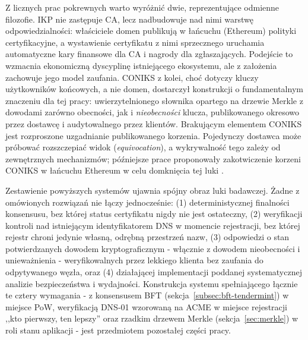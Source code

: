 Z licznych prac pokrewnych warto wyróżnić dwie, reprezentujące odmienne filozofie. IKP \cite{matsumoto2017ikp} nie zastępuje CA, lecz nadbudowuje nad nimi warstwę odpowiedzialności: właściciele domen publikują w łańcuchu (Ethereum) polityki certyfikacyjne, a wystawienie certyfikatu z nimi sprzecznego uruchamia automatyczne kary finansowe dla CA i nagrody dla zgłaszających. Podejście to wzmacnia ekonomiczną dyscyplinę istniejącego ekosystemu, ale z założenia zachowuje jego model zaufania. CONIKS \cite{melara2015coniks} z kolei, choć dotyczy kluczy użytkowników końcowych, a nie domen, dostarczył konstrukcji o fundamentalnym znaczeniu dla tej pracy: uwierzytelnionego słownika opartego na drzewie Merkle z dowodami zarówno obecności, jak i \emph{nieobecności} klucza, publikowanego okresowo przez dostawcę i audytowalnego przez klientów. Brakującym elementem CONIKS jest rozproszone uzgadnianie publikowanego korzenia. Pojedynczy dostawca może próbować rozszczepiać widok (\emph{equivocation}), a wykrywalność tego zależy od zewnętrznych mechanizmów; późniejsze prace proponowały zakotwiczenie korzeni CONIKS w łańcuchu Ethereum w celu domknięcia tej luki \cite{bonneau2016ethiks}.

\medskip

Zestawienie powyższych systemów ujawnia spójny obraz luki badawczej. Żadne z omówionych rozwiązań nie łączy jednocześnie: (1) deterministycznej finalności konsensusu, bez której status certyfikatu nigdy nie jest ostateczny, (2) weryfikacji kontroli nad istniejącym identyfikatorem DNS w momencie rejestracji, bez której rejestr chroni jedynie własną, odrębną przestrzeń nazw, (3) odpowiedzi o stan potwierdzanych dowodem kryptograficznym - włącznie z dowodem nieobecności i unieważnienia - weryfikowalnych przez lekkiego klienta bez zaufania do odpytywanego węzła, oraz (4) działającej implementacji poddanej systematycznej analizie bezpieczeństwa i wydajności. Konstrukcja systemu spełniającego łącznie te cztery wymagania - z konsensusem BFT (sekcja~\ref{subsec:bft-tendermint}) w miejsce PoW, weryfikacją DNS-01 wzorowaną na ACME w miejsce rejestracji ,,kto pierwszy, ten lepszy'' oraz rzadkim drzewem Merkle (sekcja~\ref{sec:merkle}) w roli stanu aplikacji - jest przedmiotem pozostałej części pracy.
